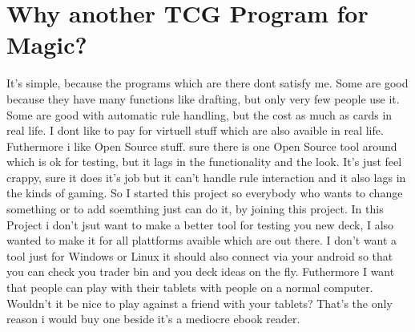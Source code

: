 \section{Why another TCG Program for Magic?} 

It's simple, because the programs which are there dont satisfy me. Some are good because they have many functions like drafting, but only very few people use it. Some are good with automatic rule handling, but the cost as much as cards in real life. I dont like to pay for virtuell stuff which are also avaible in real life. Futhermore i like Open Source stuff. sure there is one Open Source tool around which is ok for testing, but it lags in the functionality and the look. It's just feel crappy, sure it does it's job but it can't handle rule interaction and it also lags in the kinds of gaming. 
So I started this project so everybody who wants to change something or to add soemthing just can do it, by joining this project.
In this Project i don't jsut want to make a better tool for testing you new deck, I also wanted to make it for all plattforms avaible which are out there. I don't want a tool just for Windows or Linux it should also connect via your android so that you can check you trader bin and you deck ideas on the fly. Futhermore I want that people can play with their tablets with people on a normal computer. Wouldn't it be nice to play against a friend with your tablets? That's the only reason i would buy one beside it's a mediocre ebook reader. 
